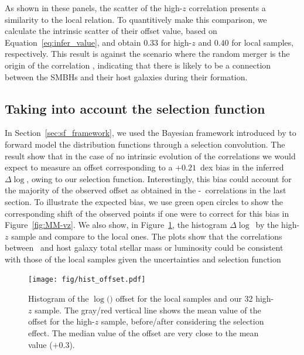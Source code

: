 \documentclass[apj]{emulateapj}
\begin{document}
As shown in these panels, the scatter of the high-$z$ correlation presents a similarity to the local relation. To quantitively make this comparison, we calculate the intrinsic scatter of their offset value, based on Equation~\ref{eq:infer_value}, and obtain $0.33$ for high-$z$ and $0.40$ for local samples, respectively. This result is against the scenario where the random merger is the origin of the correlation \citep{Peng2007}, indicating that there is likely to be a connection between the SMBHs and their host galaxies during their formation.



\subsection{Taking into account the selection function}
\label{select_eff}

In Section~\ref{sec:sf_framework}, we used the Bayesian framework introduced by \citet{Schulze2011} to forward model the distribution functions through a selection convolution. The result show that in the case of no intrinsic evolution of the correlations we would expect to measure an offset corresponding to a $+0.21$~dex bias in the inferred $\Delta \log$\mbh, owing to our selection function. Interestingly, this bias could account for the majority of the observed offset as obtained in the \mbh-\smass\ correlations in the last section. %
To illustrate the expected bias, we use green open circles to show the corresponding shift of the observed points if one were to correct for this bias in Figure~\ref{fig:MM-vz}. We also show, in Figure~\ref{fig:offset_hist}, the histogram $\Delta \log$\mbh\ by the high-$z$ sample and compare to the local ones. 
The plots show that the correlations between \mbh\ and host galaxy total stellar mass or luminosity could be consistent with those of the local samples given the uncertainties and selection function



\begin{figure}
\centering
{
\texttt{[image: fig/hist\_offset.pdf]}
}
\caption{\label{fig:offset_hist} 
Histogram of the $\log($\mbh$)$ offset for the local samples and our 32 high-$z$ sample. The gray/red vertical line shows the mean value of the offset for the high-$z$ sample, before/after considering the selection effect. The median value of the offset are very close to the mean value ($+0.3$).
}
\end{figure} 
\end{document}
